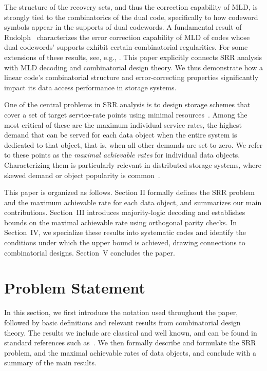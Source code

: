 \documentclass[conference,letterpaper]{IEEEtran}
\begin{document}
The structure of the recovery sets, and thus the correction capability of MLD, is strongly tied to the combinatorics of the dual code, specifically to how codeword symbols appear in the supports of dual codewords. A fundamental result of Rudolph~\cite{MLD:Rudolph67} characterizes the error correction capability of MLD of codes whose dual codewords' supports exhibit certain combinatorial regularities. For some extensions of these results, see, e.g., \cite{MLD:Ng70,MLDComDesign:RahmanB75,LySoljanin2025OneStep}. This paper explicitly connects SRR analysis with MLD decoding and combinatorial design theory. We thus demonstrate how a linear code's combinatorial structure and error-correcting properties significantly impact its data access performance in storage systems. 

One of the central problems in SRR analysis is to design storage schemes that cover a set of target service-rate points using minimal resources~\cite{SRR:journals/tit/AktasJKKS21}. Among the most critical of these are the maximum individual service rates, the highest demand that can be served for each data object when the entire system is dedicated to that object, that is, when all other demands are set to zero. We refer to these points as the \emph{maximal achievable rates} for individual data objects. Characterizing them is particularly relevant in distributed storage systems, where skewed demand or object popularity is common~\cite{SRR:journals/tit/AktasJKKS21}.

This paper is organized as follows. Section II formally defines the SRR problem and the maximum achievable rate for each data object, and summarizes our main contributions. Section~III introduces majority-logic decoding and establishes bounds on the maximal achievable rate using orthogonal parity checks. In Section~IV, we specialize these results into systematic codes and identify the conditions under which the upper bound is achieved, drawing connections to combinatorial designs. Section~V concludes the paper. %
\section{Problem Statement}\label{sec:Problem_statement}
In this section, we first introduce the notation used throughout the paper, followed by basic definitions and relevant results from combinatorial design theory. The results we include are classical and well known, and can be found in standard references such as~\cite{CombiDesigns:books/daglib/Stinson04}. We then formally describe and formulate the SRR problem, and the maximal achievable rates of data objects, and conclude with a summary of the main results.
\end{document}
